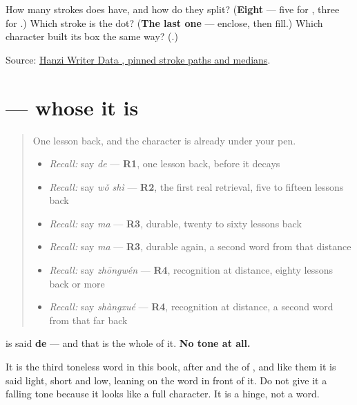 \begin{tcolorbox}[breakable,colback=teal!4,colframe=teal!35!black,title={Before you move on}]
How many strokes does  have, and how do they split? (\textbf{Eight} — five for , three for .) Which stroke is the dot? (\textbf{The last one} — enclose, then fill.) Which character built its box the same way? (\textbf{}.)

Source: \href{https://raw.githubusercontent.com/chanind/hanzi-writer-data/68d10a4b21150cae5e1ebbd223eed289cf32d90c/data/\%E7\%9A\%84.json}{Hanzi Writer Data , pinned stroke paths and medians}.
\end{tcolorbox}
\section[\texorpdfstring{\zh{的} (de)}{的 (de)}]{ — whose it is}

\label{lesson:ZH-C23-de}



\begin{quote}
One lesson back, and the character is already under your pen.

\begin{itemize}
\raggedright
  \item \emph{Recall:} say \emph{de} — \textbf{R1}, one lesson back, before it decays
  \item \emph{Recall:} say \emph{wǒ shì} — \textbf{R2}, the first real retrieval, five to fifteen lessons back
  \item \emph{Recall:} say \emph{ma} — \textbf{R3}, durable, twenty to sixty lessons back
  \item \emph{Recall:} say \emph{ma} — \textbf{R3}, durable again, a second word from that distance
  \item \emph{Recall:} say \emph{zhōngwén} — \textbf{R4}, recognition at distance, eighty lessons back or more
  \item \emph{Recall:} say \emph{shàngxué} — \textbf{R4}, recognition at distance, a second word from that far back
\end{itemize}
\end{quote}

\begin{sounds}
\textbf{} is said \textbf{de} — and that is the whole of it. \textbf{No tone at all.}

It is the third toneless word in this book, after  and the  of , and like them it is said light, short and low, leaning on the word in front of it. Do not give it a falling tone because it looks like a full character. It is a hinge, not a word.
\end{sounds}

